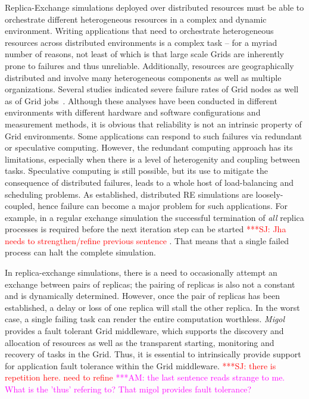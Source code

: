 \documentclass[times, 10pt, twocolumn]{article}
\newcommand{\amnote}[1]{ {\textcolor{magenta} { ***AM: #1 }}}
\newcommand{\jhanote}[1]{ {\textcolor{red} { ***SJ: #1 }}}
\newcommand{\amnote}[1]{}
\newcommand{\jhanote}[1]{}
\begin{document}
Replica-Exchange simulations deployed over distributed resources must
be able to orchestrate different heterogeneous resources in a complex
and dynamic environment.  Writing applications that need to
orchestrate heterogeneous resources across distributed environments is
a complex task -- for a myriad number of reasons, not least of which
is that large scale Grids are inherently prone to failures and thus
unreliable.  Additionally, resources are geographically distributed
and involve many heterogeneous components as well as multiple
organizations.  Several studies indicated severe failure rates of Grid
nodes as well as of Grid
jobs~\cite{schroeder,10.1109/E-SCIENCE.2006.93,DBLP:conf/grid/KhaliliHOSC06}.
Although these analyses have been conducted in different environments
with different hardware and software configurations and measurement
methods, it is obvious that reliability is not an intrinsic property
of Grid environments. Some applications can respond to such failures
via redundant or speculative computing.  However, the redundant
computing approach has its limitations, especially when there is a
level of heterogenity and coupling between tasks.  Speculative
computing is still possible, but its use to mitigate the consequence
of distributed failures, leads to a whole host of load-balancing and
scheduling problems.  As established, distributed RE simulations are
loosely-coupled, hence failure can become a major problem for such
applications.  For example, in a regular exchange simulation the
successful termination of \textit{all} replica processes is required
before the next iteration step can be started \jhanote{Jha needs to
  strengthen/refine previous sentence}. That means that a single
failed process can halt the complete simulation.

In replica-exchange simulations, there is a need to occasionally
attempt an exchange between pairs of replicas; the pairing of replicas
is also not a constant and is dynamically determined. However, once
the pair of replicas has been established, a delay or loss of one
replica will stall the other replica. In the worst case, a single
failing task can render the entire computation worthless.
\emph{Migol}~\cite{schnorLuckow08} provides a fault tolerant Grid
middleware, which supports the discovery and allocation of resources
as well as the transparent starting, monitoring and recovery of tasks
in the Grid.  Thus, it is essential to intrinsically provide support
for application fault tolerance within the Grid middleware.
\jhanote{there is repetition here. need to refine} \amnote{the last
  sentence reads strange to me.  What is the 'thus' refering to?  That
  migol provides fault tolerance?}
\end{document}
